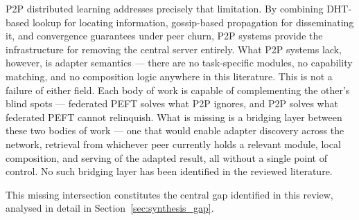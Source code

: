 P2P distributed learning addresses precisely that limitation. By combining DHT-based lookup for locating information, gossip-based propagation for disseminating it, and convergence guarantees under peer churn, P2P systems provide the infrastructure for removing the central server entirely. What P2P systems lack, however, is adapter semantics — there are no task-specific modules, no capability matching, and no composition logic anywhere in this literature.
This is not a failure of either field. Each body of work is capable of complementing the other's blind spots — federated PEFT solves what P2P ignores, and P2P solves what federated PEFT cannot relinquish. What is missing is a bridging layer between these two bodies of work — one that would enable adapter discovery across the network, retrieval from whichever peer currently holds a relevant module, local composition, and serving of the adapted result, all without a single point of control. No such bridging layer has been identified in the reviewed literature.

This missing intersection constitutes the central gap identified in this review, analysed in detail in Section~\ref{sec:synthesis_gap}.
